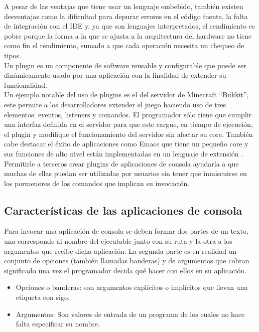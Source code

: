A pesar de las ventajas que tiene usar un lenguaje embebido, también existen desventajas como la dificultad para depurar errores en el código fuente, la falta de integración con el IDE y, ya que son lenguajes interpretados, el rendimiento es pobre porque la forma a la que se ajusta a la arquitectura del hardware no tiene como fin el rendimiento, sumado a que cada operación necesita un chequeo de tipos.\\

Un plugin es un componente de software reusable y configurable que puede ser dinámicamente usado por una aplicación con la finalidad de extender su funcionalidad.\\

Un ejemplo notable del uso de plugins es el del servidor de Minecraft “Bukkit”, este permite a los desarrolladores extender el juego haciendo uso de tres elementos: eventos, listeners y comandos. El programador sólo tiene que cumplir una interfaz definida en el servidor para que este cargue, en tiempo de ejecución, el plugin y modifique el funcionamiento del servidor sin afectar su core. También cabe destacar el éxito de aplicaciones como Emacs que tiene un pequeño core y sus funciones de alto nivel están implementadas en un lenguaje de extensión \cite{Stallman:1981:EEC:1159890.806466}. \\

Permitirle a terceros crear plugins de aplicaciones de consola ayudaría a que muchas de ellas puedan ser utilizadas por usuarios sin tener que inmiscuirse en los pormenores de los comandos que implican su invocación.

\subsection{Características de las aplicaciones de consola}

Para invocar una aplicación de consola se deben formar dos partes de un texto, una corresponde al nombre del ejecutable junto con su ruta y la otra a los argumentos que recibe dicha aplicación. La segunda parte es en realidad un conjunto de opciones (también llamadas banderas) y de argumentos que cobran significado una vez el programador decida qué hacer con ellos en su aplicación.
\begin{itemize}
\item Opciones o banderas: son argumentos explícitos o implícitos que llevan una etiqueta con sigo.
\item Argumentos: Son valores de entrada de un programa de los cuales no hace falta especificar su nombre.
\end{itemize}

